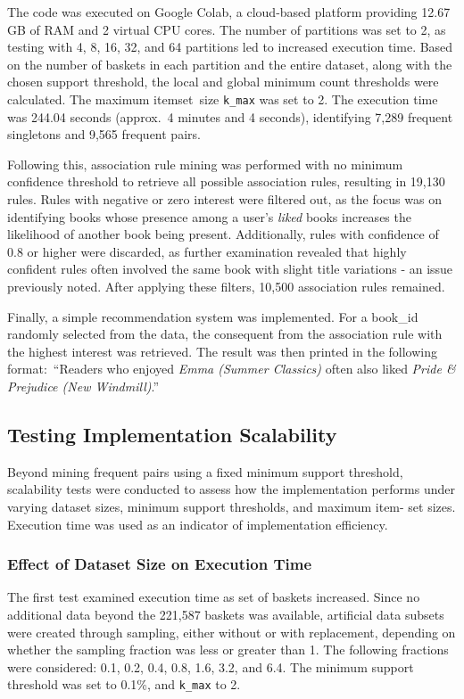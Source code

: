 \documentclass{Class/julia}
\begin{document}
The code was executed on Google Colab, a cloud-based platform providing 12.67 GB of RAM and 2 virtual CPU cores. The number of partitions was set to 2, as testing with 4, 8, 16, 32, and 64 partitions led to increased execution time. Based on the number of baskets in each partition and the entire dataset, along with the chosen support threshold, the local and global minimum count thresholds were calculated. The maximum itemset~size \texttt{k\_max} was set to 2. The execution time was 244.04 seconds (approx.\ 4 minutes and 4 seconds), identifying 7,289 frequent singletons and 9,565 frequent pairs.

Following this, association rule mining was performed with no minimum confidence threshold to retrieve all possible association rules, resulting in 19,130 rules. Rules with negative or zero interest were filtered out, as the focus was on identifying books whose presence among a user's \textit{liked} books increases the likelihood of another book being present. Additionally, rules with confidence of 0.8 or higher were discarded, as further examination revealed that highly confident rules often involved the same book with slight title variations - an issue previously noted. After applying these filters, 10,500 association rules remained.

Finally, a simple recommendation system was implemented. For a book\_id randomly selected from the data, the consequent from the association rule with the highest interest was retrieved. The result was then printed in the following format:\ ``Readers who enjoyed \textit{Emma (Summer Classics)} often also liked \textit{Pride \& Prejudice (New Windmill)}.''

\subsection{Testing Implementation Scalability}

Beyond mining frequent pairs using a fixed minimum support threshold, scalability tests were conducted to assess how the implementation performs under varying dataset sizes, minimum support thresholds, and maximum item- set sizes. Execution time was used as an indicator of implementation efficiency.

\subsubsection{Effect of Dataset Size on Execution Time}

The first test examined execution time as set of baskets increased. Since no additional data beyond the 221,587 baskets was available, artificial data subsets were created through sampling, either without or with replacement, depending on whether the sampling fraction was less or greater than 1. The following fractions were considered: 0.1, 0.2, 0.4, 0.8, 1.6, 3.2, and 6.4. The minimum support threshold was set to 0.1\%, and \texttt{k\_max} to 2.
\end{document}
